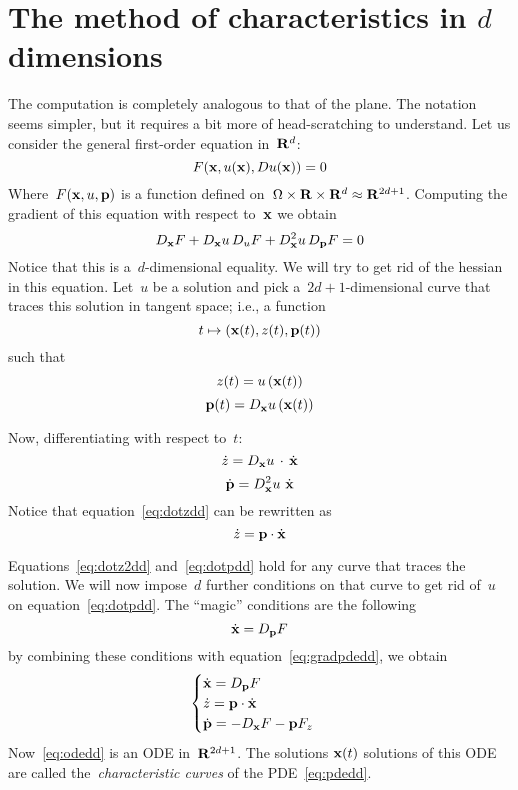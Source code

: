 \clearpage
\section{The method of characteristics in $d$ dimensions}

The computation is completely analogous to that of the plane.  The notation
seems simpler, but it requires a bit more of head-scratching to understand.
Let us consider the general first-order equation in~$\mathbf{R}^d$:
\begin{equation}\label{eq:pdedd}
	F(\mathbf{x}, u(\mathbf{x}), Du(\mathbf{x})) = 0
\end{equation}
Where~$F(\mathbf{x},u,\mathbf{p})$ is a function defined
on~$\Omega\times\mathbf{R}\times\mathbf{R}^d\approx\mathbf{R}^{2d+1}$.  Computing the gradient of
this equation with respect to~$\mathbf{x}$ we obtain
\begin{equation}\label{eq:gradpdedd}
	D_{\mathbf{x}}F + D_{\mathbf{x}}u\,D_uF + D^2_{\mathbf{x}}u\,D_{\mathbf{p}}F = 0
\end{equation}
Notice that this is a~$d$-dimensional equality.  We will try to get rid of
the hessian in this equation.  Let~$u$ be a solution and pick
a~$2d+1$-dimensional curve that traces this solution in tangent space; i.e.,
a function
\begin{equation*}
	t\mapsto\left(
		\mathbf{x}(t),z(t),\mathbf{p}(t)
	\right)
\end{equation*}
such that
\begin{equation}
	z(t)=u\left(\mathbf{x}(t)\right)
\end{equation}
\begin{equation}
	\mathbf{p}(t)=D_{\mathbf{x}}u\left(\mathbf{x}(t)\right)
\end{equation}

Now, differentiating with respect to~$t$:
\begin{equation}\label{eq:dotzdd}
	\dot z=D_{\mathbf{x}}u\,\cdot\,\dot{\mathbf{x}}
\end{equation}
\begin{equation}\label{eq:dotpdd}
	\dot{\mathbf{p}}=D^2_{\mathbf{x}}u\  \dot{\mathbf{x}}
\end{equation}
Notice that equation~\ref{eq:dotzdd} can be rewritten as
\begin{equation}\label{eq:dotz2dd}\dot z=\mathbf{p}\cdot\dot{\mathbf{x}}\end{equation}

Equations~\ref{eq:dotz2dd} and~\ref{eq:dotpdd} hold for any
curve that traces the solution.  We will now impose~$d$ further
conditions on that curve to get rid of~$u$ on equation~\ref{eq:dotpdd}.
The ``magic'' conditions are the following
\begin{equation}
	\dot{\mathbf{x}} = D_{\mathbf{p}}F
\end{equation}
by combining these conditions with equation~\ref{eq:gradpdedd}, we obtain
\begin{equation}\label{eq:odedd}
	\begin{cases}
		\dot{\mathbf{x}} = D_{\mathbf{p}}F \\
		\dot z = \mathbf{p}\cdot\dot{\mathbf{x}} \\
		\dot{\mathbf{p}} = -D_{\mathbf{x}}F - \mathbf{p} F_z \\
	\end{cases}
\end{equation}
Now~\ref{eq:odedd} is an ODE in~$\mathbf{R}^{2d+1}$.
The solutions $\mathbf{x}(t)$ solutions
of this ODE are called the~\emph{characteristic curves} of the
PDE~\ref{eq:pdedd}.


